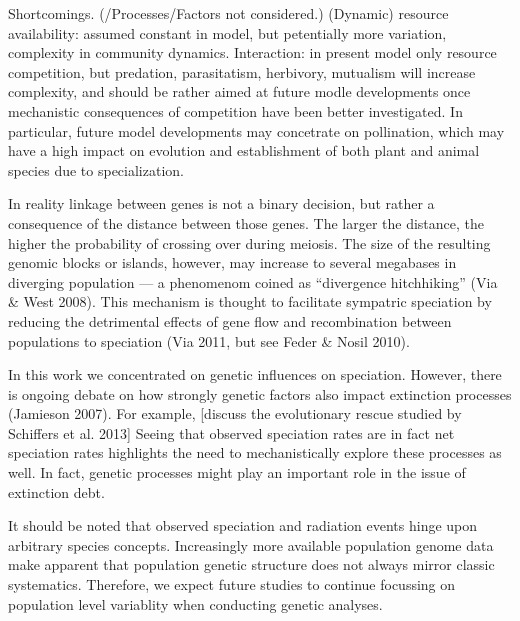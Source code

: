 \documentclass[a4paper]{scrartcl}
\begin{document}

Shortcomings. (/Processes/Factors not considered.)
(Dynamic) resource availability: assumed constant in model, but petentially more variation, complexity in community dynamics.
Interaction: in present model only resource competition, %
but predation, parasitatism, herbivory, mutualism will increase complexity,
and should be rather aimed at future modle developments once mechanistic consequences of competition have been better investigated.
In particular, future model developments may concetrate on pollination,
which may have a high impact on evolution and establishment of both plant and animal species due to specialization. %

In reality linkage between genes is not a binary decision, but rather a consequence of the distance between those genes.
The larger the distance, the higher the probability of crossing over during meiosis.
The size of the resulting genomic blocks or islands, however, may increase to several megabases in diverging population ---
a phenomenom coined as ``divergence hitchhiking'' (Via \& West 2008). %
This mechanism is thought to facilitate sympatric speciation by reducing the detrimental effects of gene flow and
recombination between populations to speciation (Via 2011, but see Feder \& Nosil 2010).

In this work we concentrated on genetic influences on speciation.
However, there is ongoing debate on how strongly genetic factors also impact extinction processes (Jamieson 2007).
For example, [discuss the evolutionary rescue studied by Schiffers et al. 2013]
Seeing that observed speciation rates are in fact net speciation rates highlights the need to mechanistically explore
these processes as well.
In fact, genetic processes might play an important role in the issue of extinction debt. %

It should be noted that observed speciation and radiation events hinge upon arbitrary species concepts.
Increasingly more available population genome data make apparent that population genetic structure does not
always mirror classic systematics.
Therefore, we expect future studies to continue focussing on population level variablity when conducting genetic analyses.
\printbibliography
\end{document}
